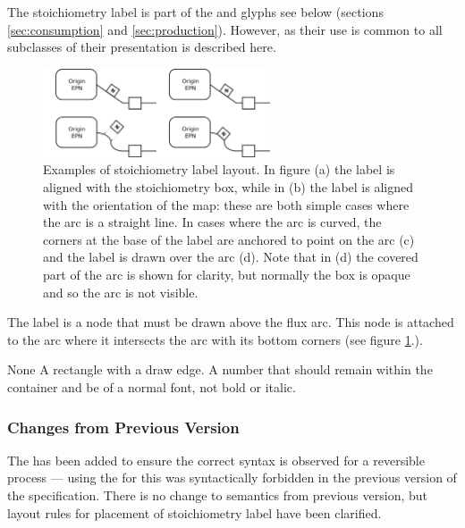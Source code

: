 The stoichiometry label is part of the  and
 glyphs see below (sections
\ref{sec:consumption} and \ref{sec:production}). However, as their use
is common to all subclasses of  their presentation
is described here.

\begin{figure}[H]
  \centering
  \includegraphics[width=0.6\textwidth]{images/stoichlabellayout}
  \caption{Examples of stoichiometry label layout. In figure (a) the
    label is aligned with the stoichiometry box, while in (b) the
    label is aligned with the orientation of the map: these are both
    simple cases where the arc is a straight line. In cases where the
    arc is curved, the corners at the base of the label are anchored
    to point on the arc (c) and the label is drawn over the arc
    (d). Note that in (d) the covered part of the arc is shown for
    clarity, but normally the box is opaque and so the arc is not
    visible.}
  \label{fig:stoichlabellayout}
\end{figure}

The label is a node that must be drawn above the flux arc. This node
is attached to the arc where it intersects the arc with its bottom
corners (see figure \ref{fig:stoichlabellayout}.).

\begin{glyphDescription}
\glyphSboTerm None
\glyphContainer A rectangle with a draw edge.
\glyphLabel A number that should remain within the container and be of
a normal font, \ie not bold or italic.
\end{glyphDescription}


\subsubsection{Changes from Previous Version}

The  has been added to ensure the correct syntax
is observed for a reversible process --- using the  for this was syntactically forbidden in the previous version of
the specification. There is no change to semantics from previous
version, but layout rules for placement of stoichiometry label have
been clarified.

